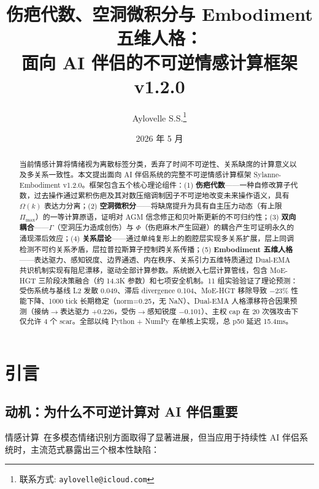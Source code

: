 \documentclass[11pt]{article}
\title{伤疤代数、空洞微积分与 Embodiment 五维人格：\\面向 AI 伴侣的不可逆情感计算框架 v1.2.0}
\author{
  Aylovelle S.S.\thanks{联系方式: \texttt{aylovelle@icloud.com}}
}
\date{2026 年 5 月}
\begin{document}
\maketitle

\begin{abstract}
当前情感计算将情绪视为离散标签分类，丢弃了时间不可逆性、关系缺席的计算意义以及多关系一致性。本文提出面向 AI 伴侣系统的完整不可逆情感计算框架 Sylanne-Embodiment v1.2.0。框架包含五个核心理论组件：(1) \textbf{伤疤代数}——一种自修改算子代数，过去操作通过累积伤疤及其对数压缩调制因子不可逆地改变未来操作语义，具有 $\Omega(k)$ 表达力分离；(2) \textbf{空洞微积分}——将缺席提升为具有自主压力动态（有上限 $\Pi_{\max}$）的一等计算原语，证明对 AGM 信念修正和贝叶斯更新的不可归约性；(3) \textbf{双向耦合}——$\Gamma$（空洞压力造成创伤）与 $\Phi$（伤疤麻木产生回避）的耦合产生可证明永久的涌现滞后效应；(4) \textbf{关系层论}——通过单纯复形上的胞腔层实现多关系扩展，层上同调检测不可约关系矛盾，层拉普拉斯算子控制跨关系传播；(5) \textbf{Embodiment 五维人格}——表达驱力、感知锐度、边界通透、内在秩序、关系引力五维特质通过 Dual-EMA 共识机制实现有阻尼漂移，驱动全部计算参数。系统嵌入七层计算管线，包含 MoE-HGT 三阶段决策融合（约 14.3K 参数）和七项安全机制。11 组实验验证了理论预测：受伤系统与基线 L2 发散 0.049、滞后 divergence 0.104、MoE-HGT 移除导致 $-23\%$ 性能下降、1000 tick 长期稳定（norm=0.25，无 NaN）、Dual-EMA 人格漂移符合因果预测（接纳$\to$表达驱力 $+0.226$，受伤$\to$感知锐度 $-0.101$）、主权 cap 在 20 次强攻击下仅允许 4 个 scar。全部以纯 Python + NumPy 在单核上实现，总 p50 延迟 15.4ms。
\end{abstract}

\section{引言}
\label{sec:intro}

\subsection{动机：为什么不可逆计算对 AI 伴侣重要}

情感计算~\cite{picard1997}在多模态情绪识别方面取得了显著进展，但当应用于持续性 AI 伴侣系统时，主流范式暴露出三个根本性缺陷：
\end{document}

